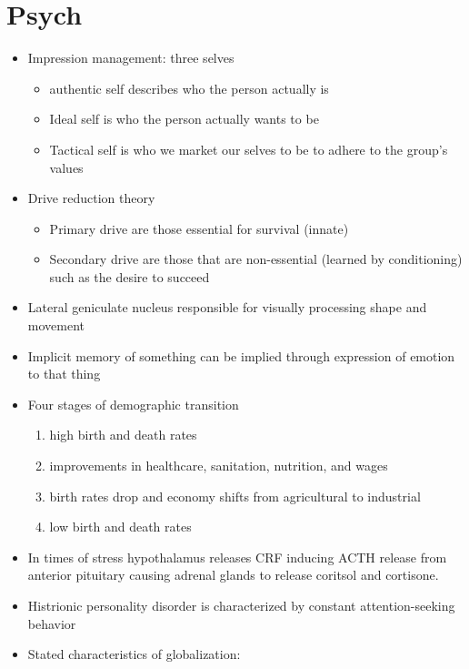 \documentclass[11pt]{article}
\begin{document}
\section{Psych}
\begin{itemize}
  \item Impression management: three selves
    \begin{itemize}
      \item authentic self describes who the person actually is
      \item Ideal self is who the person actually wants to be
      \item Tactical self is who we market our selves to be to adhere to the
        group's values
    \end{itemize}
  \item Drive reduction theory
    \begin{itemize}
      \item Primary drive are those essential for survival (innate)
      \item Secondary drive are those that are non-essential (learned by
        conditioning) such as the desire
        to succeed
    \end{itemize}
  \item Lateral geniculate nucleus responsible for visually processing shape and
    movement 
  \item Implicit memory of something can be implied through expression of
    emotion to that thing
  \item Four stages of demographic transition
    \begin{enumerate}
      \item high birth and death rates
      \item improvements in healthcare, sanitation, nutrition, and wages
      \item birth rates drop and economy shifts from agricultural to industrial
      \item low birth and death rates
    \end{enumerate}
  \item In times of stress hypothalamus releases CRF inducing ACTH release from
    anterior pituitary causing adrenal glands to release coritsol and cortisone.
  \item Histrionic personality disorder is characterized by constant
    attention-seeking behavior
  \item Stated characteristics of globalization:
    \begin{itemize}

\end{itemize}
\end{itemize}
\end{document}
